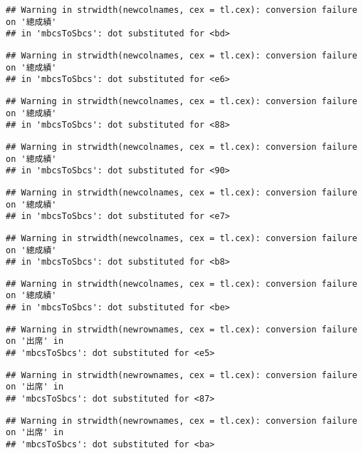 \documentclass[
]{book}
\begin{document}
\begin{verbatim}
## Warning in strwidth(newcolnames, cex = tl.cex): conversion failure on '總成績'
## in 'mbcsToSbcs': dot substituted for <bd>
\end{verbatim}

\begin{verbatim}
## Warning in strwidth(newcolnames, cex = tl.cex): conversion failure on '總成績'
## in 'mbcsToSbcs': dot substituted for <e6>
\end{verbatim}

\begin{verbatim}
## Warning in strwidth(newcolnames, cex = tl.cex): conversion failure on '總成績'
## in 'mbcsToSbcs': dot substituted for <88>
\end{verbatim}

\begin{verbatim}
## Warning in strwidth(newcolnames, cex = tl.cex): conversion failure on '總成績'
## in 'mbcsToSbcs': dot substituted for <90>
\end{verbatim}

\begin{verbatim}
## Warning in strwidth(newcolnames, cex = tl.cex): conversion failure on '總成績'
## in 'mbcsToSbcs': dot substituted for <e7>
\end{verbatim}

\begin{verbatim}
## Warning in strwidth(newcolnames, cex = tl.cex): conversion failure on '總成績'
## in 'mbcsToSbcs': dot substituted for <b8>
\end{verbatim}

\begin{verbatim}
## Warning in strwidth(newcolnames, cex = tl.cex): conversion failure on '總成績'
## in 'mbcsToSbcs': dot substituted for <be>
\end{verbatim}

\begin{verbatim}
## Warning in strwidth(newrownames, cex = tl.cex): conversion failure on '出席' in
## 'mbcsToSbcs': dot substituted for <e5>
\end{verbatim}

\begin{verbatim}
## Warning in strwidth(newrownames, cex = tl.cex): conversion failure on '出席' in
## 'mbcsToSbcs': dot substituted for <87>
\end{verbatim}

\begin{verbatim}
## Warning in strwidth(newrownames, cex = tl.cex): conversion failure on '出席' in
## 'mbcsToSbcs': dot substituted for <ba>
\end{verbatim}
\end{document}
